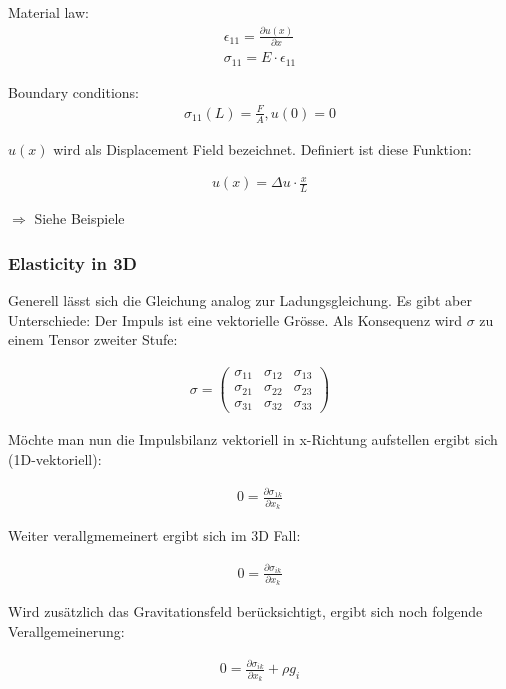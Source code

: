 \documentclass[a4paper]{scrartcl}
\begin{document}
Material law:
\begin{align}
\epsilon_{11}=\frac{\partial u(x)}{\partial x} \\
\sigma_{11}= E \cdot \epsilon_{11}
\end{align}

Boundary conditions:
\begin{align}
\sigma_{11}(L)=\frac{F}{A}, u(0)=0
\end{align}

$u(x)$ wird als \flqq Displacement Field\frqq{} bezeichnet. Definiert ist diese
Funktion:

\begin{align}
u(x)=\Delta u \cdot \frac{x}{L}
\end{align}

$\Rightarrow$ Siehe Beispiele
\subsubsection{Elasticity in 3D}
Generell lässt sich die Gleichung analog zur Ladungsgleichung. Es gibt aber
Unterschiede: Der Impuls ist eine vektorielle Grösse. Als Konsequenz wird
$\sigma$ zu einem Tensor zweiter Stufe:

\begin{align}
\sigma = \begin{pmatrix}
\sigma_{11} & \sigma_{12} & \sigma_{13} \\
\sigma_{21} & \sigma_{22} & \sigma_{23} \\
\sigma_{31} & \sigma_{32} & \sigma_{33} 
\end{pmatrix}
\end{align}

Möchte man nun die Impulsbilanz vektoriell in x-Richtung aufstellen ergibt sich
(1D-vektoriell):

\begin{align}
0=\frac{\partial \sigma_{1k}}{\partial x_k}
\end{align}

Weiter verallgmemeinert ergibt sich im 3D Fall:

\begin{align}
0=\frac{\partial \sigma_{ik}}{\partial x_k}
\end{align}

Wird zusätzlich das Gravitationsfeld berücksichtigt, ergibt sich noch folgende
Verallgemeinerung:

\begin{align}
0=\frac{\partial \sigma_{ik}}{\partial x_k} + \rho g_i
\end{align}
\end{document}
